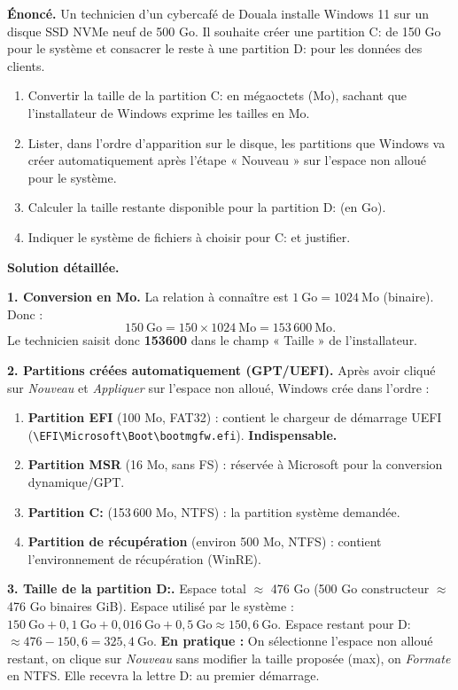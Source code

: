 \documentclass[11pt]{article}
\begin{document}
\begin{exoresolu}
\textbf{Énoncé.} Un technicien d'un cybercafé de Douala installe Windows 11 sur un disque SSD NVMe neuf de 500 Go. Il souhaite créer une partition C: de 150 Go pour le système et consacrer le reste à une partition D: pour les données des clients.
\begin{enumerate}
  \item Convertir la taille de la partition C: en mégaoctets (Mo), sachant que l'installateur de Windows exprime les tailles en Mo.
  \item Lister, dans l'ordre d'apparition sur le disque, les partitions que Windows va créer automatiquement après l'étape « Nouveau » sur l'espace non alloué pour le système.
  \item Calculer la taille restante disponible pour la partition D: (en Go).
  \item Indiquer le système de fichiers à choisir pour C: et justifier.
\end{enumerate}
\tcblower
\textbf{Solution détaillée.}

\textbf{1. Conversion en Mo.} La relation à connaître est $1~\text{Go} = 1024~\text{Mo}$ (binaire). Donc :
\[ 150~\text{Go} = 150 \times 1024~\text{Mo} = 153\,600~\text{Mo}. \]
Le technicien saisit donc \textbf{153600} dans le champ « Taille » de l'installateur.

\textbf{2. Partitions créées automatiquement (GPT/UEFI).} Après avoir cliqué sur \emph{Nouveau} et \emph{Appliquer} sur l'espace non alloué, Windows crée dans l'ordre :
\begin{enumerate}
  \item \textbf{Partition EFI} (100 Mo, FAT32) : contient le chargeur de démarrage UEFI (\texttt{\textbackslash EFI\textbackslash Microsoft\textbackslash Boot\textbackslash bootmgfw.efi}). \textbf{Indispensable.}
  \item \textbf{Partition MSR} (16 Mo, sans FS) : réservée à Microsoft pour la conversion dynamique/GPT.
  \item \textbf{Partition C:} (153\,600 Mo, NTFS) : la partition système demandée.
  \item \textbf{Partition de récupération} (environ 500 Mo, NTFS) : contient l'environnement de récupération (WinRE).
\end{enumerate}

\textbf{3. Taille de la partition D:.} Espace total $\approx$ 476 Go (500 Go constructeur $\approx$ 476 Go binaires GiB).
Espace utilisé par le système : $150~\text{Go} + 0,1~\text{Go} + 0,016~\text{Go} + 0,5~\text{Go} \approx 150,6~\text{Go}$.
Espace restant pour D: $\approx 476 - 150,6 = 325,4~\text{Go}$.
\textbf{En pratique :} On sélectionne l'espace non alloué restant, on clique sur \emph{Nouveau} sans modifier la taille proposée (max), on \emph{Formate} en NTFS. Elle recevra la lettre D: au premier démarrage.


\end{exoresolu}
\end{document}
